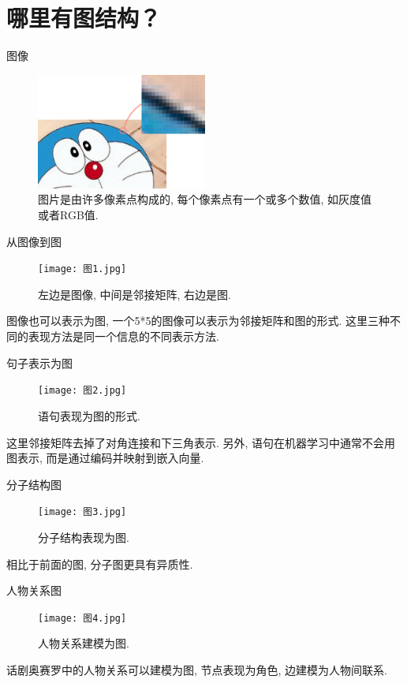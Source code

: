 \documentclass{beamer}
\begin{document}
\section{哪里有图结构？}

\begin{frame}{图像}
    \begin{figure}
        \includegraphics[width=0.5\textwidth]{图片像素.jpg}
        \caption{图片是由许多像素点构成的, 每个像素点有一个或多个数值, 如灰度值或者RGB值. }
    \end{figure}
\end{frame}

\begin{frame}{从图像到图}
    \begin{figure}
        \texttt{[image: 图1.jpg]}
        \caption{左边是图像, 中间是邻接矩阵, 右边是图. }
    \end{figure}
    图像也可以表示为图, 一个5*5的图像可以表示为邻接矩阵和图的形式. 这里三种不同的表现方法是同一个信息的不同表示方法.
\end{frame}

\begin{frame}{句子表示为图}
    \begin{figure}
        \texttt{[image: 图2.jpg]}
        \caption{语句表现为图的形式. }
    \end{figure}
    这里邻接矩阵去掉了对角连接和下三角表示. 另外, 语句在机器学习中通常不会用图表示, 而是通过编码并映射到嵌入向量.
\end{frame}

\begin{frame}{分子结构图}
    \begin{figure}
        \texttt{[image: 图3.jpg]}
        \caption{分子结构表现为图. }
    \end{figure}
    相比于前面的图, 分子图更具有异质性.
\end{frame}

\begin{frame}{人物关系图}
    \begin{figure}
        \texttt{[image: 图4.jpg]}
        \caption{人物关系建模为图. }
    \end{figure}
    话剧奥赛罗中的人物关系可以建模为图, 节点表现为角色, 边建模为人物间联系.
\end{frame}
\end{document}
